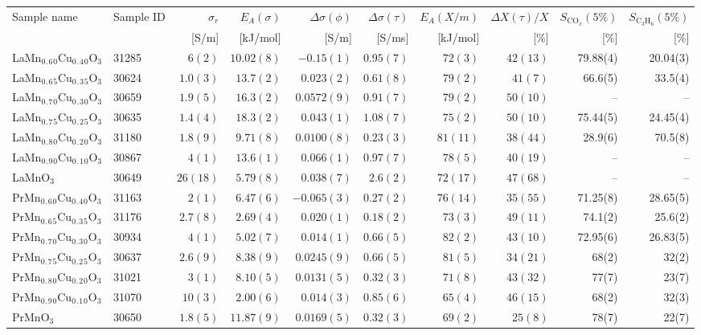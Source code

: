 \begin{tabular}{l|l|r|r|r|r|r|r|r|r}
Sample name & Sample ID & $\sigma_r$& $E_A(\sigma)$ & $\Delta \sigma (\phi)$ & $\Delta \sigma (\tau)$ & $E_A(X/m)$ & $\Delta X(\tau)/X$ & $S_{\mathrm{CO}_x}(5\%)$ & $S_{\mathrm{C}_3\mathrm{H}_6}(5\%)$\\
 & & [S/m] & [kJ/mol] & [S/m] & [S/ms] & [kJ/mol] & [\%] & [\%] & [\%]\\
\hline
LaMn$_0$$_.$$_6$$_0$Cu$_0$$_.$$_4$$_0$O$_3$ & 31285 & $6(2)$ & $10.02(8)$ & $-0.15(1)$ & $0.95(7)$ & $72(3)$  & $42(13)$& 79.88(4) & 20.04(3)\\
LaMn$_0$$_.$$_6$$_5$Cu$_0$$_.$$_3$$_5$O$_3$ & 30624 & $1.0(3)$ & $13.7(2)$ & $0.023(2)$ & $0.61(8)$ & $79(2)$  & $41(7)$& 66.6(5) & 33.5(4)\\
LaMn$_0$$_.$$_7$$_0$Cu$_0$$_.$$_3$$_0$O$_3$ & 30659 & $1.9(5)$ & $16.3(2)$ & $0.0572(9)$ & $0.91(7)$ & $79(2)$  & $50(10)$& -- & --\\
LaMn$_0$$_.$$_7$$_5$Cu$_0$$_.$$_2$$_5$O$_3$ & 30635 & $1.4(4)$ & $18.3(2)$ & $0.043(1)$ & $1.08(7)$ & $75(2)$  & $50(10)$& 75.44(5) & 24.45(4)\\
LaMn$_0$$_.$$_8$$_0$Cu$_0$$_.$$_2$$_0$O$_3$ & 31180 & $1.8(9)$ & $9.71(8)$ & $0.0100(8)$ & $0.23(3)$ & $81(11)$  & $38(44)$& 28.9(6) & 70.5(8)\\
LaMn$_0$$_.$$_9$$_0$Cu$_0$$_.$$_1$$_0$O$_3$ & 30867 & $4(1)$ & $13.6(1)$ & $0.066(1)$ & $0.97(7)$ & $78(5)$  & $40(19)$& -- & --\\
LaMnO$_3$ & 30649 & $26(18)$ & $5.79(8)$ & $0.038(7)$ & $2.6(2)$ & $72(17)$  & $47(68)$& -- & --\\
PrMn$_0$$_.$$_6$$_0$Cu$_0$$_.$$_4$$_0$O$_3$ & 31163 & $2(1)$ & $6.47(6)$ & $-0.065(3)$ & $0.27(2)$ & $76(14)$  & $35(55)$& 71.25(8) & 28.65(5)\\
PrMn$_0$$_.$$_6$$_5$Cu$_0$$_.$$_3$$_5$O$_3$ & 31176 & $2.7(8)$ & $2.69(4)$ & $0.020(1)$ & $0.18(2)$ & $73(3)$  & $49(11)$& 74.1(2) & 25.6(2)\\
PrMn$_0$$_.$$_7$$_0$Cu$_0$$_.$$_3$$_0$O$_3$ & 30934 & $4(1)$ & $5.02(7)$ & $0.014(1)$ & $0.66(5)$ & $82(2)$  & $43(10)$& 72.95(6) & 26.83(5)\\
PrMn$_0$$_.$$_7$$_5$Cu$_0$$_.$$_2$$_5$O$_3$ & 30637 & $2.6(9)$ & $8.38(9)$ & $0.0245(9)$ & $0.66(5)$ & $81(5)$  & $34(21)$& 68(2) & 32(2)\\
PrMn$_0$$_.$$_8$$_0$Cu$_0$$_.$$_2$$_0$O$_3$ & 31021 & $3(1)$ & $8.10(5)$ & $0.0131(5)$ & $0.32(3)$ & $71(8)$  & $43(32)$& 77(7) & 23(7)\\
PrMn$_0$$_.$$_9$$_0$Cu$_0$$_.$$_1$$_0$O$_3$ & 31070 & $10(3)$ & $2.00(6)$ & $0.014(3)$ & $0.85(6)$ & $65(4)$  & $46(15)$& 68(2) & 32(3)\\
PrMnO$_3$ & 30650 & $1.8(5)$ & $11.87(9)$ & $0.0169(5)$ & $0.32(3)$ & $69(2)$  & $25(8)$& 78(7) & 22(7)\\
\hline
\end{tabular}